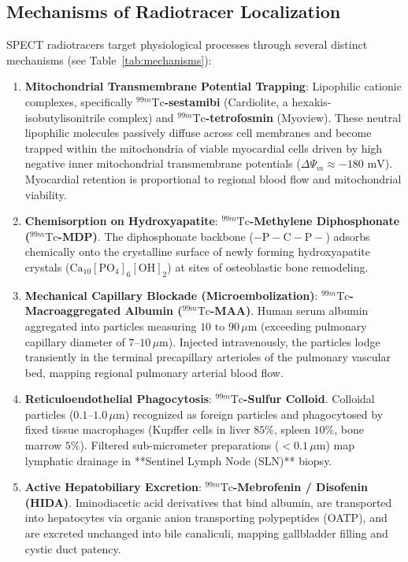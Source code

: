 \documentclass[11pt,a4paper]{article}
\begin{document}
\subsection{Mechanisms of Radiotracer Localization}
SPECT radiotracers target physiological processes through several distinct mechanisms (see Table~\ref{tab:mechanisms}):
\begin{enumerate}[leftmargin=*]
    \item \textbf{Mitochondrial Transmembrane Potential Trapping}: Lipophilic cationic complexes, specifically \textbf{$^{99m}\text{Tc}$-sestamibi} (Cardiolite, a hexakis-isobutylisonitrile complex) and \textbf{$^{99m}\text{Tc}$-tetrofosmin} (Myoview). These neutral lipophilic molecules passively diffuse across cell membranes and become trapped within the mitochondria of viable myocardial cells driven by high negative inner mitochondrial transmembrane potentials ($\Delta\Psi_m \approx -180\text{ mV}$). Myocardial retention is proportional to regional blood flow and mitochondrial viability.
    \item \textbf{Chemisorption on Hydroxyapatite}: \textbf{$^{99m}\text{Tc}$-Methylene Diphosphonate ($^{99m}\text{Tc}$-MDP)}. The diphosphonate backbone ($-\text{P}-\text{C}-\text{P}-$) adsorbs chemically onto the crystalline surface of newly forming hydroxyapatite crystals ($\text{Ca}_{10}[\text{PO}_4]_6[\text{OH}]_2$) at sites of osteoblastic bone remodeling.
    \item \textbf{Mechanical Capillary Blockade (Microembolization)}: \textbf{$^{99m}\text{Tc}$-Macroaggregated Albumin ($^{99m}\text{Tc}$-MAA)}. Human serum albumin aggregated into particles measuring $10\text{ to }90\,\mu\text{m}$ (exceeding pulmonary capillary diameter of $7\text{--}10\,\mu\text{m}$). Injected intravenously, the particles lodge transiently in the terminal precapillary arterioles of the pulmonary vascular bed, mapping regional pulmonary arterial blood flow.
    \item \textbf{Reticuloendothelial Phagocytosis}: \textbf{$^{99m}\text{Tc}$-Sulfur Colloid}. Colloidal particles ($0.1\text{--}1.0\,\mu\text{m}$) recognized as foreign particles and phagocytosed by fixed tissue macrophages (Kupffer cells in liver $85\%$, spleen $10\%$, bone marrow $5\%$). Filtered sub-micrometer preparations ($<0.1\,\mu\text{m}$) map lymphatic drainage in **Sentinel Lymph Node (SLN)** biopsy.
    \item \textbf{Active Hepatobiliary Excretion}: \textbf{$^{99m}\text{Tc}$-Mebrofenin / Disofenin (HIDA)}. Iminodiacetic acid derivatives that bind albumin, are transported into hepatocytes via organic anion transporting polypeptides (OATP), and are excreted unchanged into bile canaliculi, mapping gallbladder filling and cystic duct patency.

\end{enumerate}
\end{document}
